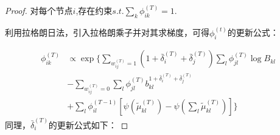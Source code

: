 \begin{proof}
	对每个节点$i$,存在约束$s.t. \sum_k \phi_{ik}^{(T)} = 1$.
	
	利用拉格朗日法，引入拉格朗乘子并对其求梯度，可得$\phi_i^{(t)}$的更新公式：
	
	
	
	\begin{equation}
		\begin{split}
			\phi_{ik}^{(T)} & \propto \exp\{ \sum_{w_{ij}^{(T)}=1} (1+\bar{\delta}_i^{(T)}+\bar{\delta}_j^{(T)}) \sum_l \phi_{jl}^{(T)} \log B_{kl} \\
			& -\sum_{w_{ij}^{(T)}=0} \sum_l \phi_{jl}^{(T)}  b_{kl}^{1+\bar{\delta}_i^{(T)}+\bar{\delta}_j^{(T)}}  \\
			& + \sum_l \phi_{il}^{(T-1)} [\psi(\tilde{\mu}_{kl}^{(T)}) - \psi(\sum_l \tilde{\mu}_{kl}^{(T)})] \}
		\end{split}
		\label{appendix:eq:phiT}
	\end{equation}
	同理，$\bar{\delta}_i^{(T)}$的更新公式如下：
	

\end{proof}
